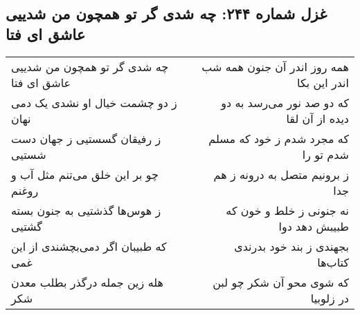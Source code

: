 \begin{center}
\section*{غزل شماره ۲۴۴: چه شدی گر تو همچون من شدییی عاشق ای فتا}
\label{sec:0244}
\begin{longtable}{l p{0.5cm} r}
چه شدی گر تو همچون من شدییی عاشق ای فتا
&&
همه روز اندر آن جنون همه شب اندر این بکا
\\
ز دو چشمت خیال او نشدی یک دمی نهان
&&
که دو صد نور می‌رسد به دو دیده از آن لقا
\\
ز رفیقان گسستیی ز جهان دست شستیی
&&
که مجرد شدم ز خود که مسلم شدم تو را
\\
چو بر این خلق می‌تنم مثل آب و روغنم
&&
ز برونیم متصل به درونه ز هم جدا
\\
ز هوس‌ها گذشتیی به جنون بسته گشتیی
&&
نه جنونی ز خلط و خون که طبیبش دهد دوا
\\
که طبیبان اگر دمی‌بچشندی از این غمی
&&
بجهندی ز بند خود بدرندی کتاب‌ها
\\
هله زین جمله درگذر بطلب معدن شکر
&&
که شوی محو آن شکر چو لبن در زلوبیا
\\
\end{longtable}
\end{center}
